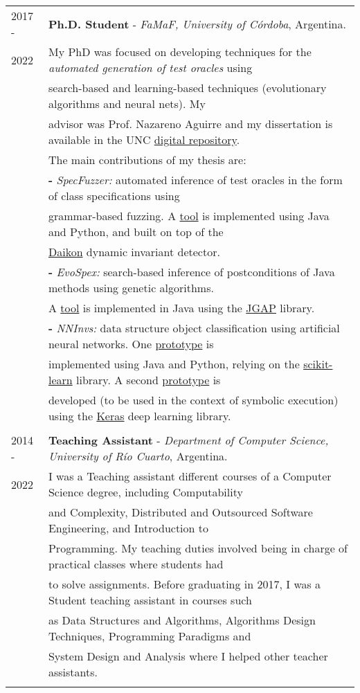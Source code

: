 \documentclass[a4paper,10pt]{article} %
\begin{document}
\begin{longtable}{ll}
2017 - & \textbf{Ph.D. Student} - \textit{FaMaF, University of Córdoba}, Argentina. \\ 
2022 & My PhD was focused on developing techniques for the \textit{automated generation of test oracles} using \\
& search-based and learning-based techniques (evolutionary algorithms and neural nets). My \\
& advisor was Prof. Nazareno Aguirre and my dissertation is available in the UNC \href{https://rdu.unc.edu.ar/handle/11086/26692}{digital repository}. \\ 
& The main contributions of my thesis are: \\ 
& \textbf{-} \textit{SpecFuzzer:} automated inference of test oracles in the form of class specifications using \\
& grammar-based fuzzing. A \href{https://github.com/facumolina/specfuzzer}{tool} is implemented using Java and Python, and built on top of the \\ 
& \href{https://plse.cs.washington.edu/daikon/}{Daikon} dynamic invariant detector. \\ 
& \textbf{-} \textit{EvoSpex:} search-based inference of postconditions of Java methods using genetic algorithms. \\
& A \href{https://github.com/facumolina/evospex}{tool} is implemented in Java using the \href{https://homepages.ecs.vuw.ac.nz/~lensenandr/jgap/documentation/}{JGAP} library. \\ 
& \textbf{-} \textit{NNInvs:} data structure object classification using artificial neural networks. One \href{https://sites.google.com/site/learninginvariants}{prototype} is \\
& implemented using Java and Python, relying on the \href{https://scikit-learn.org/stable/index.html}{scikit-learn} library. A second \href{https://sites.google.com/site/learninginvariants}{prototype} is \\ 
& developed (to be used in the context of symbolic execution) using the \href{https://keras.io/}{Keras} deep learning library. \\ & \\

2014 - & \textbf{Teaching Assistant} - \textit{Department of Computer Science, University of Río Cuarto}, Argentina. \\ 
2022 & I was a Teaching assistant different courses of a Computer Science degree, including Computability \\
& and Complexity, Distributed and Outsourced Software Engineering, and Introduction to \\
& Programming. My teaching duties involved being in charge of practical classes where students had \\  
& to solve assignments. Before graduating in 2017, I was a Student teaching assistant in courses such \\ 
& as Data Structures and Algorithms, Algorithms Design Techniques, Programming Paradigms and \\
& System Design and Analysis where I helped other teacher assistants. \\ & \\


\end{longtable}
\end{document}
